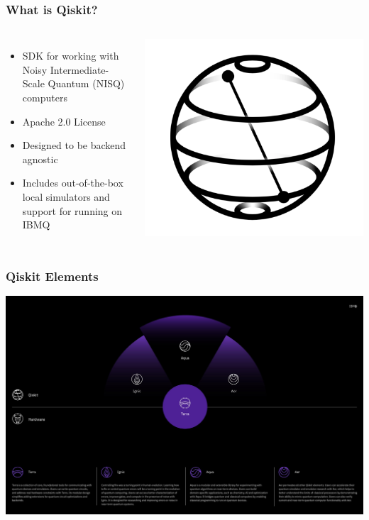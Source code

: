 \documentclass[aspectratio=169,11pt,hyperref={colorlinks=true}]{beamer}
\begin{document}
\begin{frame}
    \frametitle{What is Qiskit?}
    \begin{columns}
            \begin{itemize}
                \item SDK for working with Noisy Intermediate-Scale Quantum (NISQ) computers
                \item Apache 2.0 License
                \item Designed to be backend agnostic
                \item Includes out-of-the-box local simulators and support for running on IBMQ
            \end{itemize}
            \includegraphics[width=\textwidth]{qiskit_logo.png}
    \end{columns}
\end{frame}

\begin{frame}
    \frametitle{Qiskit Elements}
    \centering
    \includegraphics[width=.99\textwidth]{qiskit-components.jpeg}
\end{frame}
\end{document}
